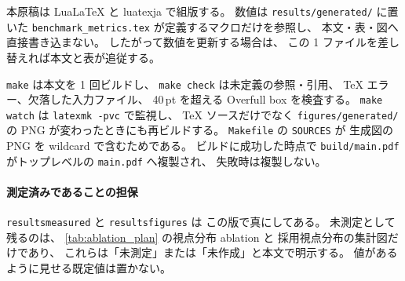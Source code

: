 本原稿は LuaLaTeX と luatexja で組版する。
数値は \texttt{results/generated/} に置いた
\texttt{benchmark\_metrics.tex} が定義するマクロだけを参照し、
本文・表・図へ直接書き込まない。
したがって数値を更新する場合は、
この 1 ファイルを差し替えれば本文と表が追従する。

\texttt{make} は本文を 1 回ビルドし、
\texttt{make check} は未定義の参照・引用、
TeX エラー、欠落した入力ファイル、
40\,pt を超える Overfull box を検査する。
\texttt{make watch} は \texttt{latexmk -pvc} で監視し、
TeX ソースだけでなく
\texttt{figures/generated/} の PNG が変わったときにも再ビルドする。
\texttt{Makefile} の \texttt{SOURCES} が
生成図の PNG を wildcard で含むためである。
ビルドに成功した時点で
\texttt{build/main.pdf} がトップレベルの \texttt{main.pdf} へ複製され、
失敗時は複製しない。

\paragraph{測定済みであることの担保}
\texttt{resultsmeasured} と \texttt{resultsfigures} は
この版で真にしてある。
未測定として残るのは、
\cref{tab:ablation_plan} の視点分布 ablation と
採用視点分布の集計図だけであり、
これらは「未測定」または「未作成」と本文で明示する。
値があるように見せる既定値は置かない。
